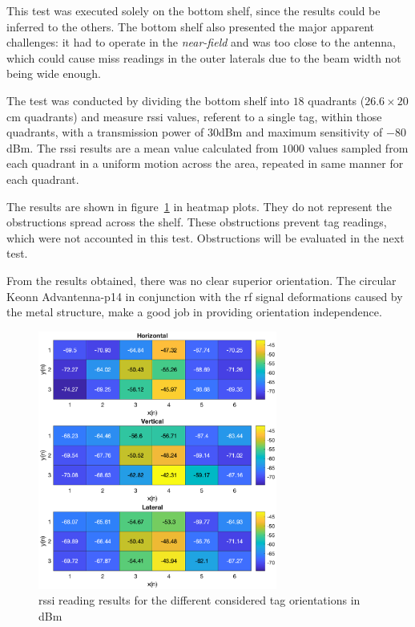 This test was executed solely on the bottom shelf, since the results could be inferred to the others. The bottom shelf also presented the major apparent challenges: it had to operate in the \emph{near-field} and was too close to the antenna, which could cause miss readings in the outer laterals due to the beam width not being wide enough.

The test was conducted by dividing the bottom shelf into $18$ quadrants ($26.6\times20$cm quadrants) and measure \ac{rssi} values, referent to a single tag, within those quadrants, with a transmission power of $30$dBm and maximum sensitivity of $-80$dBm. The \ac{rssi} results are a mean value calculated from $1000$ values sampled from each quadrant in a uniform motion across the area, repeated in same manner for each quadrant.

The results are shown in figure~\ref{fig:tagorientationsresults} in heatmap plots.
They do not represent the obstructions spread across the shelf. These obstructions prevent tag readings, which were not accounted in this test. Obstructions will be evaluated in the next test.

From the results obtained, there was no clear superior orientation. The circular Keonn Advantenna-p14 in conjunction with the \ac{rf} signal deformations caused by the metal structure, make a good job in providing orientation independence.

\begin{figure}
    \centering
    \includegraphics[width=0.7\textwidth]{figs/tests/RSSI_shelve.eps}
    \caption{\ac{rssi} reading results for the different considered tag orientations in dBm}
    \label{fig:tagorientationsresults}
\end{figure}

